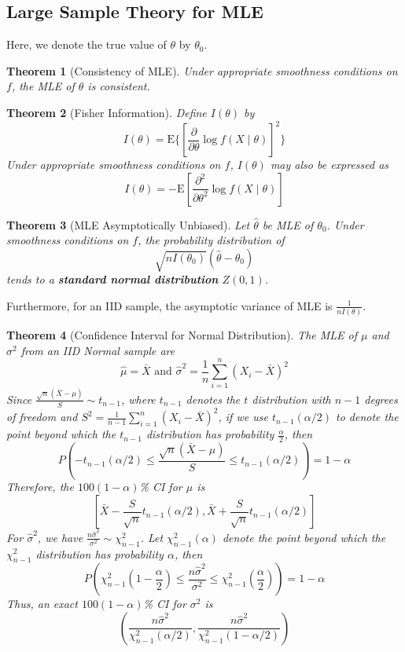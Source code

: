 \documentclass[12pt]{article}
\newcommand{\expec}{\mathrm{E}}
\newtheorem{theorem}{Theorem}[section]
\theoremstyle{definition}
\begin{document}
\subsection{Large Sample Theory for MLE}
Here, we denote the true value of $\theta$ by $\theta_0$.
\begin{theorem}[Consistency of MLE]
\normalfont Under appropriate smoothness conditions on $f$, the MLE of $\theta$ is consistent.
\end{theorem}
\begin{theorem}[Fisher Information]
\normalfont Define $I(\theta)$ by
\[
I(\theta) = \expec\{[\frac{\partial}{\partial \theta} \log f(X\mid \theta)]^2\}
\]
Under appropriate smoothness conditions on $f$, $I(\theta)$ may also be expressed as
\[
I(\theta) = -\expec[\frac{\partial^2}{\partial \theta^2}\log f(X\mid \theta)]
\]
\end{theorem}
\begin{theorem}[MLE Asymptotically Unbiased]
\normalfont Let $\hat{\theta}$ be MLE of $\theta_0$. Under smoothness conditions on $f$, the probability distribution of 
\[
\sqrt{nI(\theta_0)}(\hat{\theta}-\theta_0)
\]
tends to a \textbf{standard normal distribution} $Z(0,1)$.
\end{theorem}
Furthermore, for an IID sample, the asymptotic variance of MLE is $\frac{1}{nI(\theta)}$.
\begin{theorem}[Confidence Interval for Normal Distribution]
The MLE of $\mu$ and $\sigma^2$ from an IID Normal sample are
\[
\hat{\mu}=\bar{X}\text{  and  }\hat{\sigma}^2=\frac{1}{n}\sum_{i=1}^n (X_i-\bar{X})^2
\]
Since $\frac{\sqrt{n}(\bar{X}-\mu)}{S}\sim t_{n-1}$, where $t_{n-1}$ denotes the $t$ distribution with $n-1$ degrees of freedom and $S^2=\frac{1}{n-1}\sum_{i=1}^n (X_i-\bar{X})^2$, if we use $t_{n-1}(\alpha/2)$ to denote the point beyond which the $t_{n-1}$ distribution has probability $\frac{\alpha}{2}$, then
\[
P(-t_{n-1}(\alpha/2)\leq \frac{\sqrt{n}(\bar{X}-\mu)}{S}\leq t_{n-1}(\alpha/2))=1-\alpha
\]
Therefore, the $100(1-\alpha)$\% CI for $\mu$ is
\[
[\bar{X}-\frac{S}{\sqrt{n}}t_{n-1}(\alpha/2), \bar{X}+\frac{S}{\sqrt{n}}t_{n-1}(\alpha/2)]
\]
For $\hat{\sigma}^2$, we have $\frac{n\hat{\sigma}^2}{\sigma^2}\sim \chi_{n-1}^2$. Let $\chi_{n-1}^2(\alpha)$ denote the point beyond which the $\chi_{n-1}^2$ distribution has probability $\alpha$, then
\[
P(\chi_{n-1}^2(1-\frac{\alpha}{2})\leq \frac{n\hat{\sigma}^2}{\sigma^2} \leq \chi_{n-1}^2(\frac{\alpha}{2}))=1-\alpha
\]
Thus, an exact $100(1-\alpha)$\% CI for $\sigma^2$ is
\[
(\frac{n\hat{\sigma}^2}{\chi_{n-1}^2(\alpha/2)}, \frac{n\hat{\sigma}^2}{\chi_{n-1}^2(1-\alpha/2)})
\]
\end{theorem}
\end{document}
